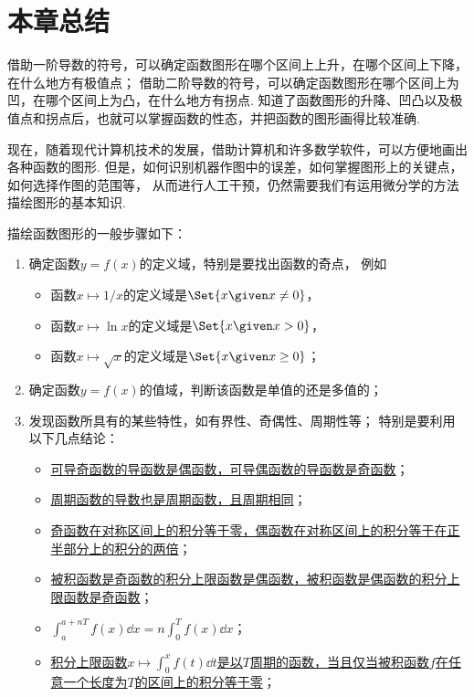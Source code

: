 \section{本章总结}
借助一阶导数的符号，可以确定函数图形在哪个区间上上升，在哪个区间上下降，在什么地方有极值点；
借助二阶导数的符号，可以确定函数图形在哪个区间上为凹，在哪个区间上为凸，在什么地方有拐点.
知道了函数图形的升降、凹凸以及极值点和拐点后，也就可以掌握函数的性态，并把函数的图形画得比较准确.

现在，随着现代计算机技术的发展，借助计算机和许多数学软件，可以方便地画出各种函数的图形.
但是，如何识别机器作图中的误差，如何掌握图形上的关键点，如何选择作图的范围等，
从而进行人工干预，仍然需要我们有运用微分学的方法描绘图形的基本知识.

描绘函数图形的一般步骤如下：\begin{enumerate}
	\item 确定函数\(y=f(x)\)的定义域，特别是要找出函数的奇点，
	例如\begin{itemize}
		\item 函数\(x \mapsto 1/x\)的定义域是\(\Set{ x \given x\neq0 }\)，
		\item 函数\(x \mapsto \ln x\)的定义域是\(\Set{ x \given x>0 }\)，
		\item 函数\(x \mapsto \sqrt{x}\)的定义域是\(\Set{ x \given x\geq0 }\)；
	\end{itemize}

	\item 确定函数\(y=f(x)\)的值域，判断该函数是单值的还是多值的；

	\item 发现函数所具有的某些特性，如有界性、奇偶性、周期性等；
	特别是要利用以下几点结论：\begin{itemize}
		\item \hyperref[theorem:导数与微分.导函数的奇偶性]{可导奇函数的导函数是偶函数，可导偶函数的导函数是奇函数}；
		\item \hyperref[theorem:导数与微分.导函数的周期性]{周期函数的导数也是周期函数，且周期相同}；
		\item \hyperref[theorem:定积分.利用对称性简化计算1]{奇函数在对称区间上的积分等于零，偶函数在对称区间上的积分等于在正半部分上的积分的两倍}；
		\item \hyperref[theorem:定积分.积分上限函数的奇偶性]{被积函数是奇函数的积分上限函数是偶函数，被积函数是偶函数的积分上限函数是奇函数}；
		\item \hyperref[theorem:定积分.周期函数的积分]{$\int_a^{a+nT} f(x) \dd{x} = n\int_0^T f(x) \dd{x}$}；
		\item \hyperref[example:定积分.积分上限函数是周期函数的充分必要条件]{积分上限函数\(x \mapsto \int_0^x f(t) \dd{t}\)是以\(T\)周期的函数，当且仅当被积函数\(f\)在任意一个长度为\(T\)的区间上的积分等于零}；
	\end{itemize}


\end{enumerate}
